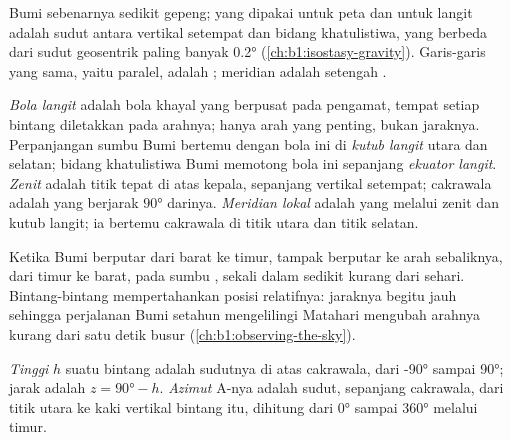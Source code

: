 Bumi sebenarnya sedikit gepeng;  yang dipakai untuk peta dan untuk langit adalah sudut antara vertikal setempat dan bidang khatulistiwa, yang berbeda dari sudut geosentrik paling banyak \ang{0.2} (\cref{ch:b1:isostasy-gravity}). Garis-garis  yang sama, yaitu paralel, adalah ; meridian adalah setengah .

\begin{definition}\label{def:b1:spherical-astronomy:celestial-sphere}
\emph{Bola langit} adalah bola khayal yang berpusat pada pengamat, tempat setiap bintang diletakkan pada arahnya; hanya arah yang penting, bukan jaraknya. Perpanjangan sumbu Bumi bertemu dengan bola ini di \emph{kutub langit} utara dan selatan; bidang khatulistiwa Bumi memotong bola ini sepanjang \emph{ekuator langit}. \emph{Zenit} adalah titik tepat di atas kepala, sepanjang vertikal setempat; cakrawala adalah  yang berjarak $\ang{90}$ darinya. \emph{Meridian lokal} adalah  yang melalui zenit dan kutub langit; ia bertemu cakrawala di titik utara dan titik selatan.
\end{definition}

Ketika Bumi berputar dari barat ke timur,  tampak berputar ke arah sebaliknya, dari timur ke barat, pada sumbu , sekali dalam sedikit kurang dari sehari. Bintang-bintang mempertahankan posisi relatifnya: jaraknya begitu jauh sehingga perjalanan Bumi setahun mengelilingi Matahari mengubah arahnya kurang dari satu detik busur (\cref{ch:b1:observing-the-sky}).

\begin{definition}\label{def:b1:spherical-astronomy:horizontal}
\emph{Tinggi} $h$ suatu bintang adalah sudutnya di atas cakrawala, dari \ang{-90} sampai \ang{90}; jarak  adalah $z = \ang{90} - h$. \emph{Azimut} $\mathrm{A}$-nya adalah sudut, sepanjang cakrawala, dari titik utara ke kaki vertikal bintang itu, dihitung dari \ang{0} sampai \ang{360} melalui timur.
\end{definition}

